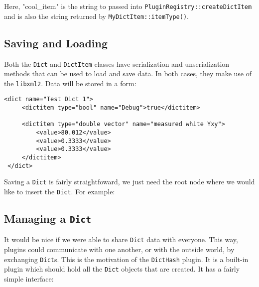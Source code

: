 Here, "cool\_item" is the string to passed into {\tt PluginRegistry::createDictItem} and
is also the string returned by {\tt MyDictItem::itemType()}.




\subsection{Saving and Loading}

Both the {\tt Dict} and {\tt DictItem} classes have serialization and unserialization
methods that can be used to load and save data. In both cases, they make use of 
the {\tt libxml2}. Data will be stored in a form:

\begin{lstlisting}[frame=single]
 <dict name="Test Dict 1">
     <dictitem type="bool" name="Debug">true</dictitem>

     <dictitem type="double vector" name="measured white Yxy">
         <value>80.012</value>
         <value>0.3333</value>
         <value>0.3333</value>
     </dictitem>
 </dict>
\end{lstlisting}

Saving a {\tt Dict} is fairly straightfoward, we just need the root node where
we would like to insert the {\tt Dict}. For example:


\subsection{Managing a {\tt Dict}}

It would be nice if we were able to share {\tt Dict} data with everyone. 
This way, plugins could communicate with one another, or with the
outside world, by exchanging {\tt Dict}s. This is the motivation of the
{\tt DictHash} plugin. It is a built-in plugin which should hold all 
the {\tt Dict} objects that are created. It has a fairly simple interface:



